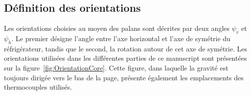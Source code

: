 \subsection{Définition des orientations}

Les orientations choisies au moyen des palans sont décrites par deux angles $\psi_v$ et $\psi_h$. Le premier désigne l'angle entre l'axe horizontal et l'axe de symétrie du réfrigérateur, tandis que le second, la rotation autour de cet axe de symétrie. Les orientations utilisées dans les différentes parties de ce manuscript sont présentées sur la figure~\ref{fig:OrientationCore}. Cette figure, dans laquelle la gravité est toujours dirigée vers le bas de la page, présente également les emplacements des thermocouples utilisés. 

%    

